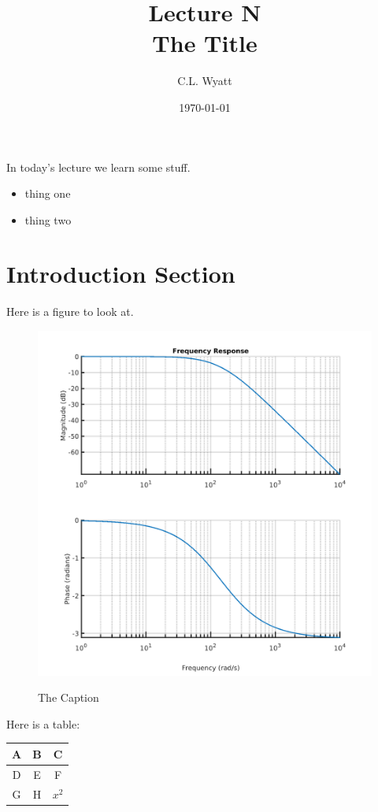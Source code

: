 \documentclass{article}
\begin{document}
\title{Lecture N\\ The Title}
\author{C.L. Wyatt}
\date{\today}
\maketitle

In today's lecture we learn some stuff.

\begin{itemize}
\item thing one
\item thing two
\end{itemize}

\section{Introduction Section}

Here is a figure to look at.

\begin{figure}
  \centering
  \includegraphics[alt={Description Here}]{lecture20_1.png}
  \caption{The Caption}
\end{figure}

Here is a table:

\begin{table}
  \centering
  \begin{tabular}{ccc}
    A & B & C\\\hline
    D & E & F\\
    G & H & $x^2$\\
    \hline
  \end{tabular}
\end{table}
\end{document}
